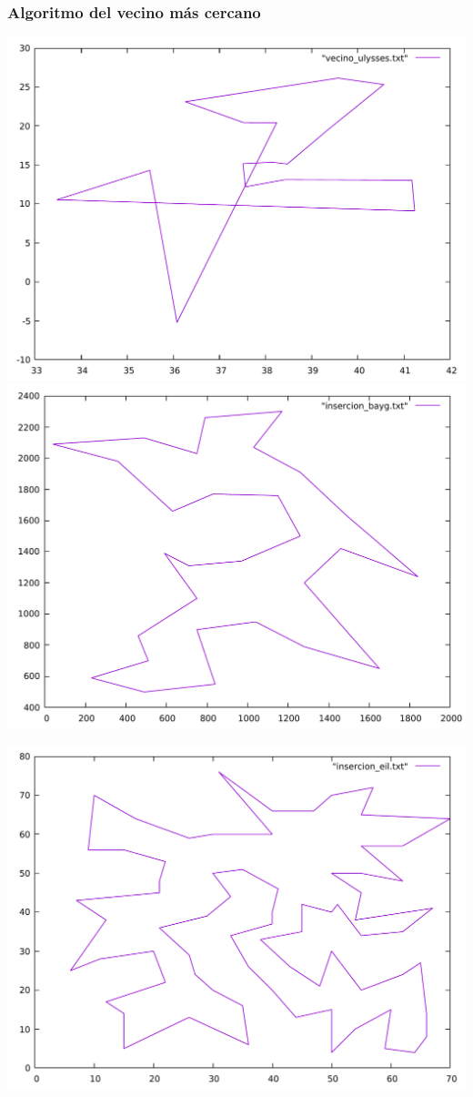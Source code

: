 \documentclass[13pt]{beamer}
\begin{document}
	\begin{frame}
		\frametitle{Algoritmo del vecino más cercano}
			\includegraphics[scale=0.2]{../src/vecino_ulysses.pdf}
			\includegraphics[scale=0.2]{../src/insercion_bayg.pdf}
			\begin{center}
				\includegraphics[scale=0.2]{../src/insercion_eil.pdf}
			\end{center}
	\end{frame}
\end{document}
